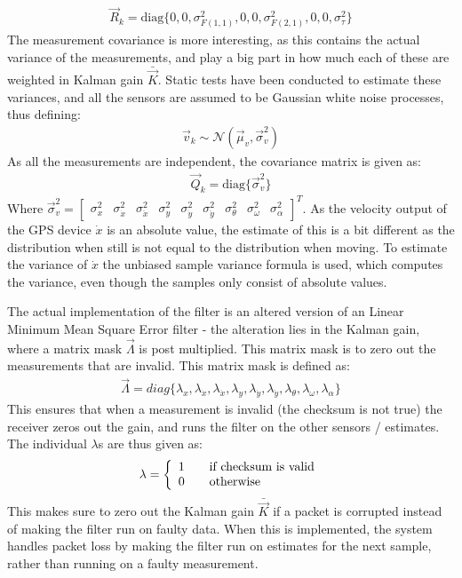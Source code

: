 \documentclass[journal]{IEEEtran}
\begin{document}
\begin{align}
\vec{R}_k = \text{diag}\{0,0,\sigma^2_{F(1,1)},0,0,\sigma^2_{F(2,1)},0,0,\sigma^2_\tau\}
\end{align}
The measurement covariance is more interesting, as this contains the actual variance of the measurements, and play a big part in how much each of these are weighted in Kalman gain $\bar{\vec{K}}$. Static tests have been conducted to estimate these variances, and all the sensors are assumed to be Gaussian white noise processes, thus defining:
\begin{align}
\vec{v}_k  \sim \mathcal{N}(\vec{\mu}_v,\vec{\sigma}^2_{v})
\end{align}
As all the measurements are independent, the covariance matrix is given as:
\begin{align}
\vec{Q}_k = \text{diag}\{\vec{\sigma}^2_{v}\}
\end{align}
Where $\vec{\sigma}^2_{v} = \begin{bmatrix}\sigma^2_x & \sigma^2_{\dot{x}} & \sigma^2_{{\ddot{x}}} & \sigma^2_y & \sigma^2_{\dot{y}} & \sigma^2_{{\ddot{y}}} & \sigma^2_\theta & \sigma^2_\omega & \sigma^2_\alpha \end{bmatrix}^T$. As the velocity output of the GPS device $\dot{x}$ is an absolute value, the estimate of this is a bit different as the distribution when still is not equal to the distribution when moving. To estimate the variance of $\dot{x}$ the unbiased sample variance formula is used, which computes the variance, even though the samples only consist of absolute values. 

The actual implementation of the filter is an altered version of an Linear Minimum Mean Square Error filter - the alteration lies in the Kalman gain, where a matrix mask $\vec{\Lambda}$ is post multiplied. This matrix mask is to zero out the measurements that are invalid. This matrix mask is defined as:
\begin{align}
\vec{\Lambda} = diag\{ \lambda_x,\lambda_{\dot{x}},\lambda_{\ddot{x}},\lambda_y,\lambda_{\dot{y}},\lambda_{\ddot{y}},\lambda_{\theta},\lambda_{\omega},\lambda_{\alpha} \}
\end{align}
This ensures that when a measurement is invalid (the checksum is not true) the receiver zeros out the gain, and runs the filter on the other sensors / estimates. The individual $\lambda$s are thus given as:
\begin{align}
\lambda = 
\left\{
  \begin{array}{l l}
    1 & \quad \text{if checksum is valid}\\
    0 & \quad \text{otherwise}
  \end{array} \right.
\end{align} 
This makes sure to zero out the Kalman gain $\bar{\vec{K}}$ if a packet is corrupted instead of making the filter run on faulty data. When this is implemented, the system handles packet loss by making the filter run on estimates for the next sample, rather than running on a faulty measurement.
\end{document}
